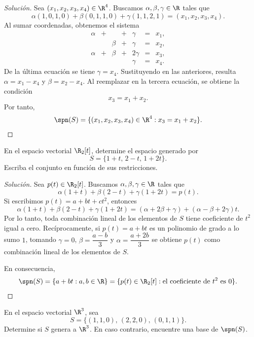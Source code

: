 \documentclass[a4,11pt]{aleph-notas}
\begin{document}
\begin{proof}[Solución]\hspace{0pt}
    Sea $(x_1,x_2,x_3,x_4)\in\R^4$. Buscamos $\alpha,\beta,\gamma\in\R$ tales que
    \[
        \alpha(1,0,1,0)+\beta(0,1,1,0)+\gamma(1,1,2,1)=(x_1,x_2,x_3,x_4).
    \]
    Al sumar coordenadas, obtenemos el sistema
    \[
        \begin{array}{ccccccc}
            \alpha & + & & + & \gamma & = & x_1,\\
             & & \beta & + & \gamma & = & x_2,\\
            \alpha & + & \beta & + & 2\gamma & = & x_3,\\
             & & & & \gamma & = & x_4.
        \end{array}
    \]
    De la última ecuación se tiene $\gamma=x_4$. Sustituyendo en las anteriores, resulta $\alpha=x_1-x_4$ y $\beta=x_2-x_4$. Al reemplazar en la tercera ecuación, se obtiene la condición
    \[
        x_3=x_1+x_2.
    \]
    Por tanto,
    \[
        \spn(S)=\{(x_1,x_2,x_3,x_4)\in\R^4: x_3=x_1+x_2\}.
    \]
\end{proof}

\begin{ejer}
    En el espacio vectorial $\R_2[t]$, determine el espacio generado por
    \[
        S=\{1+t,\,2-t,\,1+2t\}.
    \]
    Escriba el conjunto en función de sus restricciones.
\end{ejer}

\begin{proof}[Solución]\hspace{0pt}
    Sea $p(t)\in\R_2[t]$. Buscamos $\alpha,\beta,\gamma\in\R$ tales que
    \[
        \alpha(1+t)+\beta(2-t)+\gamma(1+2t)=p(t).
    \]
    Si escribimos $p(t)=a+bt+ct^2$, entonces
    \[
        \alpha(1+t)+\beta(2-t)+\gamma(1+2t)=(\alpha+2\beta+\gamma)+(\alpha-\beta+2\gamma)t.
    \]
    Por lo tanto, toda combinación lineal de los elementos de $S$ tiene coeficiente de $t^2$ igual a cero. Recíprocamente, si $p(t)=a+bt$ es un polinomio de grado a lo sumo $1$, tomando $\gamma=0$, $\beta=\dfrac{a-b}{3}$ y $\alpha=\dfrac{a+2b}{3}$ se obtiene $p(t)$ como combinación lineal de los elementos de $S$.

    En consecuencia,
    \[
        \spn(S)=\{a+bt: a,b\in\R\}=\{p(t)\in\R_2[t]: \text{el coeficiente de }t^2\text{ es }0\}.
    \]
\end{proof}

\begin{ejer}
    En el espacio vectorial $\R^3$, sea
    \[
        S=\{(1,1,0),\,(2,2,0),\,(0,1,1)\}.
    \]
    Determine si $S$ genera a $\R^3$. En caso contrario, encuentre una base de $\spn(S)$.
\end{ejer}
\end{document}
